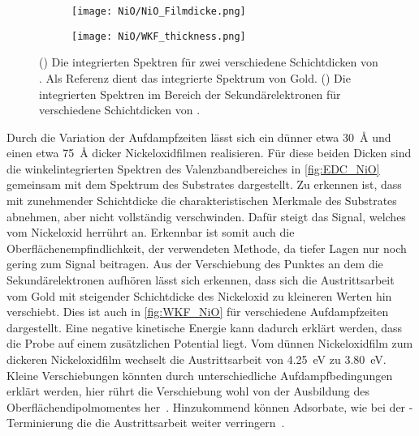         \begin{figure}
            \centering
            \begin{subfigure}[t]{0.48\textwidth}
                \centering
                \texttt{[image: NiO/NiO\_Filmdicke.png]}
                \subcaption{}
                \label{fig:EDC_NiO}
            \end{subfigure}
            \begin{subfigure}[t]{0.48\textwidth}
                \centering
                \texttt{[image: NiO/WKF\_thickness.png]}
                \caption{}
                \label{fig:WKF_NiO}
            \end{subfigure}
            \caption{() Die integrierten Spektren für zwei verschiedene Schichtdicken von . Als Referenz dient das integrierte Spektrum von Gold. 
            () Die integrierten Spektren im Bereich der Sekundärelektronen für verschiedene Schichtdicken von .}
        \end{figure}
        Durch die Variation der Aufdampfzeiten lässt sich ein dünner etwa \SI{30}{\angstrom} und einen etwa \SI{75}{\angstrom} dicker Nickeloxidfilmen realisieren.
        Für diese beiden Dicken sind die winkelintegrierten Spektren des Valenzbandbereiches in \autoref{fig:EDC_NiO} gemeinsam mit dem Spektrum des Substrates dargestellt.
        Zu erkennen ist, dass mit zunehmender Schichtdicke die charakteristischen Merkmale des Substrates abnehmen, aber nicht vollständig verschwinden.
        Dafür steigt das Signal, welches vom Nickeloxid herrührt an.
        Erkennbar ist somit auch die Oberflächenempfindlichkeit, der verwendeten Methode, da tiefer Lagen nur noch gering zum Signal beitragen.
        Aus der Verschiebung des Punktes an dem die Sekundärelektronen aufhören lässt sich erkennen, dass sich die Austrittsarbeit vom Gold mit steigender Schichtdicke des Nickeloxid zu kleineren Werten hin verschiebt.
        Dies ist auch in \autoref{fig:WKF_NiO} für verschiedene Aufdampfzeiten dargestellt.
        Eine negative kinetische Energie kann dadurch erklärt werden, dass die Probe auf einem zusätzlichen Potential liegt.
        Vom dünnen Nickeloxidfilm zum dickeren Nickeloxidfilm wechselt die Austrittsarbeit von \SI{4.25}{\electronvolt} zu \SI{3.80}{\electronvolt}.
        Kleine Verschiebungen könnten durch unterschiedliche Aufdampfbedingungen erklärt werden, hier rührt die Verschiebung wohl von der Ausbildung des Oberflächendipolmomentes her~\cite{5A_5}.
        Hinzukommend können Adsorbate, wie bei der -Terminierung die die Austrittsarbeit weiter verringern~\cite{NiO_40}.
